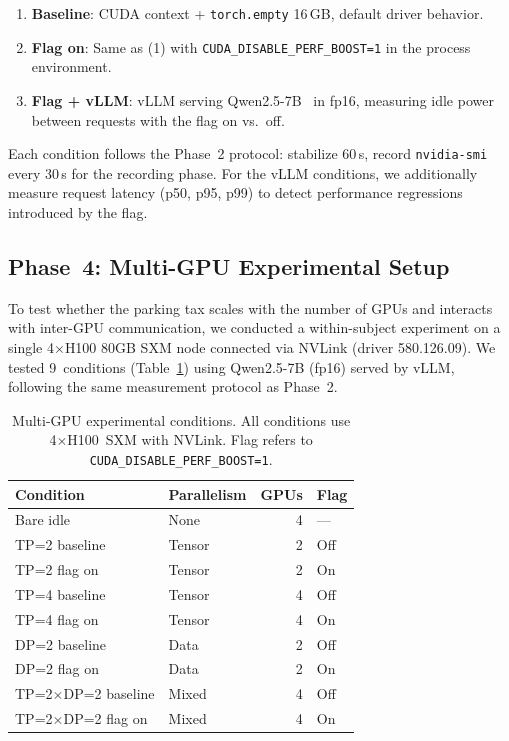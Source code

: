 \documentclass[sigconf,nonacm]{acmart}
\newcommand{\perfboost}{\texttt{CUDA\_\hspace{0pt}DISABLE\_\hspace{0pt}PERF\_\hspace{0pt}BOOST}}
\begin{document}
\begin{enumerate}
    \item \textbf{Baseline}: CUDA context + \texttt{torch.empty} 16\,GB, default driver behavior.
    \item \textbf{Flag on}: Same as (1) with \perfboost\texttt{=1} in the process environment.
    \item \textbf{Flag + vLLM}: vLLM serving Qwen2.5-7B~\cite{qwen2} in fp16, measuring idle power between requests with the flag on vs.\ off.
\end{enumerate}

Each condition follows the Phase~2 protocol: stabilize 60\,s, record \texttt{nvidia-smi} every 30\,s for the recording phase. For the vLLM conditions, we additionally measure request latency (p50, p95, p99) to detect performance regressions introduced by the flag.

\subsection{Phase~4: Multi-GPU Experimental Setup}
\label{sec:multi-gpu-setup}

To test whether the parking tax scales with the number of GPUs and interacts with inter-GPU communication, we conducted a within-subject experiment on a single 4$\times$H100 80GB SXM node connected via NVLink (driver 580.126.09). We tested 9~conditions (Table~\ref{tab:multi-gpu-conditions}) using Qwen2.5-7B (fp16) served by vLLM, following the same measurement protocol as Phase~2.

\begin{table}[t]
\caption{Multi-GPU experimental conditions. All conditions use 4$\times$H100~SXM with NVLink. Flag refers to \perfboost\texttt{=1}.}
\label{tab:multi-gpu-conditions}
\small
\begin{tabular}{llrl}
\toprule
\textbf{Condition} & \textbf{Parallelism} & \textbf{GPUs} & \textbf{Flag} \\
\midrule
Bare idle & None & 4 & --- \\
TP=2 baseline & Tensor & 2 & Off \\
TP=2 flag on & Tensor & 2 & On \\
TP=4 baseline & Tensor & 4 & Off \\
TP=4 flag on & Tensor & 4 & On \\
DP=2 baseline & Data & 2 & Off \\
DP=2 flag on & Data & 2 & On \\
TP=2$\times$DP=2 baseline & Mixed & 4 & Off \\
TP=2$\times$DP=2 flag on & Mixed & 4 & On \\
\bottomrule
\end{tabular}
\end{table}
\end{document}
